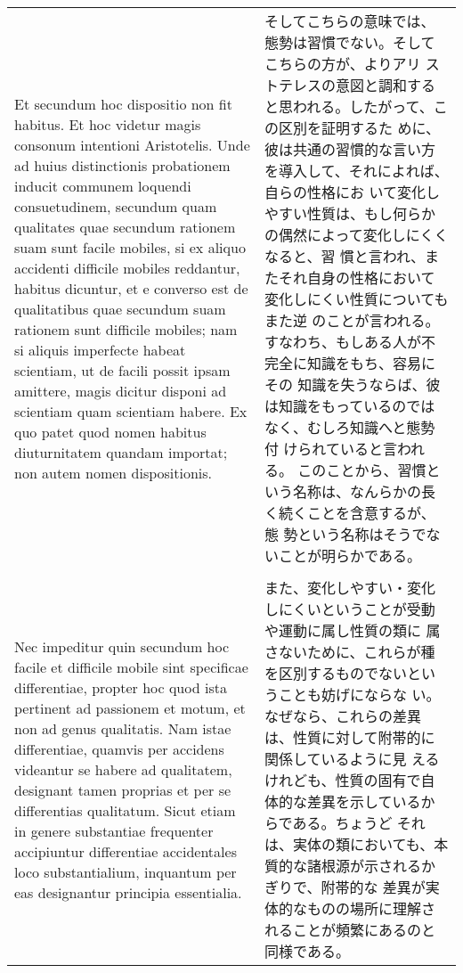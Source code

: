 \documentclass[10pt]{jsarticle} %
\begin{document}
\begin{longtable}{p{21em}p{21em}}
\\


Et secundum hoc dispositio non fit habitus. Et hoc videtur
magis consonum intentioni Aristotelis. Unde ad huius distinctionis
probationem inducit communem loquendi consuetudinem, secundum quam
qualitates quae secundum rationem suam sunt facile mobiles, si ex
aliquo accidenti difficile mobiles reddantur, habitus dicuntur, et e
converso est de qualitatibus quae secundum suam rationem sunt
difficile mobiles; nam si aliquis imperfecte habeat scientiam, ut de
facili possit ipsam amittere, magis dicitur disponi ad scientiam quam
scientiam habere. 
Ex quo patet quod nomen habitus diuturnitatem
quandam importat; non autem nomen dispositionis. 


&

そしてこちらの意味では、態勢は習慣でない。そしてこちらの方が、よりアリ
ストテレスの意図と調和すると思われる。したがって、この区別を証明するた
めに、彼は共通の習慣的な言い方を導入して、それによれば、自らの性格にお
いて変化しやすい性質は、もし何らかの偶然によって変化しにくくなると、習
慣と言われ、またそれ自身の性格において変化しにくい性質についてもまた逆
のことが言われる。すなわち、もしある人が不完全に知識をもち、容易にその
知識を失うならば、彼は知識をもっているのではなく、むしろ知識へと態勢付
けられていると言われる。
このことから、習慣という名称は、なんらかの長く続くことを含意するが、態
勢という名称はそうでないことが明らかである。

\\




&


\\

Nec impeditur quin
secundum hoc facile et difficile mobile sint specificae differentiae,
propter hoc quod ista pertinent ad passionem et motum, et non ad genus
qualitatis. 
Nam istae differentiae, quamvis per accidens videantur se
habere ad qualitatem, designant tamen proprias et per se differentias
qualitatum. Sicut etiam in genere substantiae frequenter accipiuntur
differentiae accidentales loco substantialium, inquantum per eas
designantur principia essentialia.

&

また、変化しやすい・変化しにくいということが受動や運動に属し性質の類に
属さないために、これらが種を区別するものでないということも妨げにならな
い。なぜなら、これらの差異は、性質に対して附帯的に関係しているように見
えるけれども、性質の固有で自体的な差異を示しているからである。ちょうど
それは、実体の類においても、本質的な諸根源が示されるかぎりで、附帯的な
差異が実体的なものの場所に理解されることが頻繁にあるのと同様である。

\\
\end{longtable}
\end{document}
